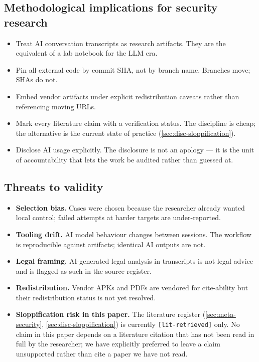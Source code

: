 \documentclass[11pt,a4paper]{article}
\begin{document}
\subsection{Methodological implications for security research}
\label{sec:disc-methodology}
\begin{itemize}
  \item Treat AI conversation transcripts as research artifacts. They are
        the equivalent of a lab notebook for the LLM era.
  \item Pin all external code by commit SHA, not by branch name. Branches
        move; SHAs do not.
  \item Embed vendor artifacts under explicit redistribution caveats rather
        than referencing moving URLs.
  \item Mark every literature claim with a verification status. The
        discipline is cheap; the alternative is the current state of
        practice (\cref{sec:disc-sloppification}).
  \item Disclose AI usage explicitly. The disclosure is not an apology
        --- it is the unit of accountability that lets the work be
        audited rather than guessed at.
\end{itemize}

\subsection{Threats to validity}
\label{sec:disc-threats}
\label{sec:disc-validity}
\begin{itemize}
  \item \textbf{Selection bias.} Cases were chosen because the researcher
        already wanted local control; failed attempts at harder targets are
        under-reported.
  \item \textbf{Tooling drift.} AI model behaviour changes between
        sessions. The workflow is reproducible against artifacts; identical
        AI outputs are not.
  \item \textbf{Legal framing.} AI-generated legal analysis in transcripts
        is not legal advice and is flagged as such in the source register.
  \item \textbf{Redistribution.} Vendor APKs and PDFs are vendored for
        cite-ability but their redistribution status is not yet resolved.
  \item \textbf{Sloppification risk in this paper.} The literature
        register (\cref{sec:meta-security},
        \cref{sec:disc-sloppification}) is currently
        \texttt{[lit-retrieved]} only. No claim in this paper depends
        on a literature citation that has not been read in full by the
        researcher; we have explicitly preferred to leave a claim
        unsupported rather than cite a paper we have not read.
\end{itemize}
\end{document}
